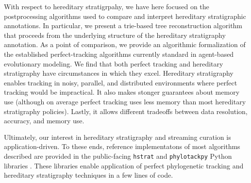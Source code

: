 With respect to hereditary stratigrpahy, we have here focused on the postprocessing algorithms used to compare and interpret hereditary stratigraphic annotations.
In particular, we present a trie-based tree reconstruction algorithm that proceeds from the underlying structure of the hereditary stratigraphy annotation.
As a point of comparison, we provide an algorithmic formalization of the established perfect-tracking algorithms currently standard in agent-based evolutionary modeling.
We find that both perfect tracking and hereditary stratigraphy have circumstances in which they excel.
Hereditary stratigraphy enables tracking in noisy, parallel, and distributed environments where perfect tracking would be impractical.
It also makes stonger guarantees about memory use (although on average perfect tracking uses less memory than most hereditary stratigraphy policies).
Lastly, it allows different tradeoffs between data resolution, accuracy, and memory use.


Ultimately, our interest in hereditary stratigraphy and streaming curation is application-driven.
To these ends, reference implementatons of most algorithms described are provided in the public-facing \texttt{hstrat} and \texttt{phylotackpy} Python libraries \citep{moreno2022hstrat, dolson2023phylotrackpy}.
These libraries enable application of perfect phylogenetic tracking and hereditary stratigraphy techniques in a few lines of code.
